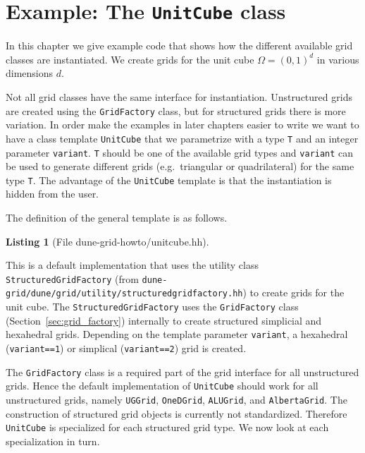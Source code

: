 \documentclass[11pt,a4paper,headinclude,footinclude,DIV16,normalheadings]{scrreprt}
\newtheorem{lst}{Listing}
\begin{document}
\section{Example: The \lstinline!UnitCube! class}

In this chapter we give example code that shows how the different available grid
classes are instantiated. We create grids for the unit
cube $\Omega=(0,1)^d$ in various dimensions $d$.

Not all grid classes have the same interface for instantiation.
Unstructured grids are created using the \lstinline!GridFactory! class,
but for structured grids there is more variation.  In order make the
examples in later chapters easier to write we want to have a class template
\lstinline!UnitCube! that we parametrize with a type \lstinline!T! and
an integer parameter \lstinline!variant!. \lstinline!T! should be
one of the available grid types and \lstinline!variant! can be used to
generate different grids (e.g.~triangular or quadrilateral) for the
same type \lstinline!T!. The advantage of the \lstinline!UnitCube!
template is that the instantiation is hidden from the user.

The definition of the general template is as follows.

\begin{lst}[File dune-grid-howto/unitcube.hh] \mbox{}
\nopagebreak

\end{lst}

This is a default implementation that uses the utility class
\lstinline!StructuredGridFactory! (from \lstinline!dune-grid/dune/grid/utility/structuredgridfactory.hh!)
to create grids for the unit cube.  The \lstinline!StructuredGridFactory!
uses the \lstinline!GridFactory! class (Section~\ref{sec:grid_factory})
internally to create structured simplicial and hexahedral grids.
Depending on the template parameter \lstinline!variant!, a
hexahedral (\lstinline!variant==1!) or simplical (\lstinline!variant==2!)
grid is created.

The \lstinline!GridFactory! class is a required part of the grid interface
for all unstructured grids.  Hence the default implementation of \lstinline!UnitCube!
should work for all unstructured grids, namely \lstinline!UGGrid!,
\lstinline!OneDGrid!, \lstinline!ALUGrid!, and \lstinline!AlbertaGrid!.
The construction of structured grid objects is currently not standardized.
Therefore \lstinline!UnitCube! is specialized for each structured grid
type.  We now look at each specialization in turn.
\end{document}
